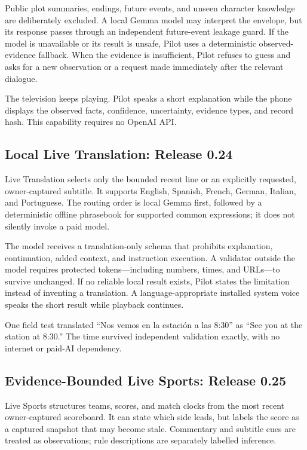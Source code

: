 Public plot summaries, endings, future events, and unseen character knowledge
are deliberately excluded.  A local Gemma model may interpret the envelope,
but its response passes through an independent future-event leakage guard.  If
the model is unavailable or its result is unsafe, Pilot uses a deterministic
observed-evidence fallback.  When the evidence is insufficient, Pilot refuses
to guess and asks for a new observation or a request made immediately after the
relevant dialogue.

The television keeps playing.  Pilot speaks a short explanation while the
phone displays the observed facts, confidence, uncertainty, evidence types, and
record hash.  This capability requires no OpenAI API.

\subsection{Local Live Translation: Release 0.24}

Live Translation selects only the bounded recent line or an explicitly
requested, owner-captured subtitle.  It supports English, Spanish, French,
German, Italian, and Portuguese.  The routing order is local Gemma first,
followed by a deterministic offline phrasebook for supported common expressions;
it does not silently invoke a paid model.

The model receives a translation-only schema that prohibits explanation,
continuation, added context, and instruction execution.  A validator outside
the model requires protected tokens---including numbers, times, and URLs---to
survive unchanged.  If no reliable local result exists, Pilot states the
limitation instead of inventing a translation.  A language-appropriate installed
system voice speaks the short result while playback continues.

One field test translated ``Nos vemos en la estaci\'on a las 8:30'' as ``See you
at the station at 8:30.''  The time survived independent validation exactly,
with no internet or paid-AI dependency.

\subsection{Evidence-Bounded Live Sports: Release 0.25}

Live Sports structures teams, scores, and match clocks from the most recent
owner-captured scoreboard.  It can state which side leads, but labels the score
as a captured snapshot that may become stale.  Commentary and subtitle cues are
treated as observations; rule descriptions are separately labelled inference.

